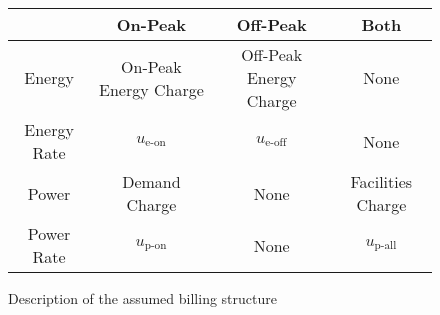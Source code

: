 \begin{figure*}
	\centering
	\begin{tabular}{c | c c c}
		            & On-Peak               & Off-Peak               & Both \\ \hline
		Energy      & On-Peak Energy Charge & Off-Peak Energy Charge & None \\
		Energy Rate & $u_{\text{e-on}}$     & $u_{\text{e-off}}$     & None \\
		Power       & Demand Charge         & None                   & Facilities Charge \\
		Power Rate  & $u_{\text{p-on}}$     & None                   & $u_{\text{p-all}}$
	\end{tabular}
	\caption{Description of the assumed billing structure}
	\label{fig:charges}
\end{figure*}
